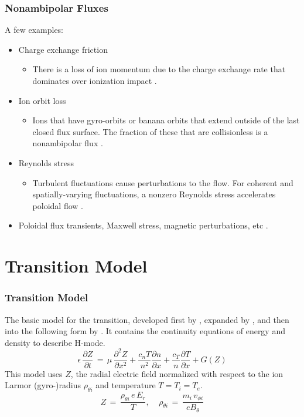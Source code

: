 \documentclass{beamer}
\begin{document}
\begin{frame}
\frametitle{Nonambipolar Fluxes}
A few examples:
\begin{itemize}
	\item Charge exchange friction
	\begin{itemize}
		\item There is a loss of ion momentum due to the charge exchange rate that dominates over ionization impact \parencite{toda_theoretical_1997}.
	\end{itemize}
	\item Ion orbit loss
	\begin{itemize}
		\item Ions that have gyro-orbits or banana orbits that extend outside of the last closed flux surface. The fraction of these that are collisionless is a nonambipolar flux \parencite{chankin_loss_1993}.
	\end{itemize}
	\item Reynolds stress
	\begin{itemize}
		\item Turbulent fluctuations cause perturbations to the flow. For coherent and spatially-varying fluctuations, a nonzero Reynolds stress accelerates poloidal flow \parencite{diamond_theory_1991}.
	\end{itemize}
\item Poloidal flux transients, Maxwell stress, magnetic perturbations, etc \parencite{staps_backstepping_2017}.
\end{itemize}
\end{frame}


\section{Transition Model}
\begin{frame}
\frametitle{Transition Model}
	The basic model for the transition, developed first by \textcite{itoh_edge_1991}, expanded by \textcite{zohm_dynamic_1994}, and then into the following form by \textcite{weymiens_bifurcation_2014}.
It contains the continuity equations of energy and density to describe H-mode.
\begin{equation*}
	\epsilon\,\frac{\partial Z}{\partial t} \,=\, \mu\,\frac{\partial^2 Z}{\partial x^2} + \frac{c_n T}{n^2} \frac{\partial n}{\partial x} + \frac{c_T}{n} \frac{\partial T}{\partial x} + G(Z)
	\label{eq:pde}
\end{equation*}
This model uses $Z$, the radial electric field normalized with respect to the ion Larmor (gyro-)radius $\rho_{\theta i}$ and temperature $T = T_i = T_e$.
\begin{equation*}
	Z \,=\, \frac{\rho_{\theta i} \, e \, E_r}{T}, ~~~~~ \rho_{\theta i} \,=\, \frac{m_i \, v_{\phi i}}{e B_\theta}
	\label{eq:normalization}
\end{equation*}
\end{frame}
\end{document}
